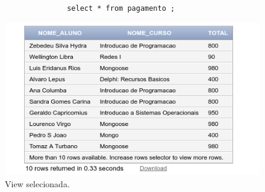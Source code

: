 \documentclass[
article,			%
11pt,				%
oneside,			%
a4paper,			%
english,			%
brazil,				%
sumario=tradicional
]{abntex2}
\begin{document}
\begin{enumerate}
\begin{verbatim}
					select * from pagamento ;
					\end{verbatim}
					
						
					\begin{center}
						\begin{figure}[H]
							\centering
							\includegraphics[scale=0.5]{./imagens/at-04.png}
							\caption{View selecionada.}
							\label{rota-1}
						\end{figure}
					\end{center}
					

\end{enumerate}
\end{document}
